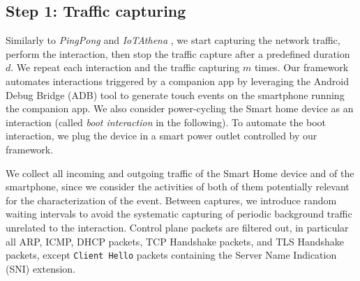                 
                
                


\subsection{Step 1: Traffic capturing}
\label{sec:traffic-capture}

Similarly to \emph{PingPong} \cite{ping-pong} and \emph{IoTAthena} \cite{wan_iotathena_2022}, we start capturing the network traffic, perform the interaction, then stop the traffic capture after a predefined duration $d$. We repeat each interaction and the traffic capturing $m$ times.
Our framework automates interactions triggered by a companion app by leveraging the Android Debug Bridge (ADB) tool \cite{adb} to generate touch events on the smartphone running the companion app. 
We also consider power-cycling the Smart home device as an interaction (called \emph{boot interaction} in the following). To automate the boot interaction, we plug the device in a smart power outlet controlled by our framework.

We collect all incoming and outgoing traffic of the Smart Home device and of the smartphone, since we consider the activities of both of them potentially relevant for the characterization of the event. Between captures, we introduce random waiting intervals to avoid the systematic capturing of periodic background traffic unrelated to the interaction.
Control plane packets are filtered out, in particular all ARP, ICMP, DHCP packets, TCP Handshake packets, and TLS Handshake packets, except \texttt{Client Hello} packets containing the Server Name Indication (SNI) extension.

